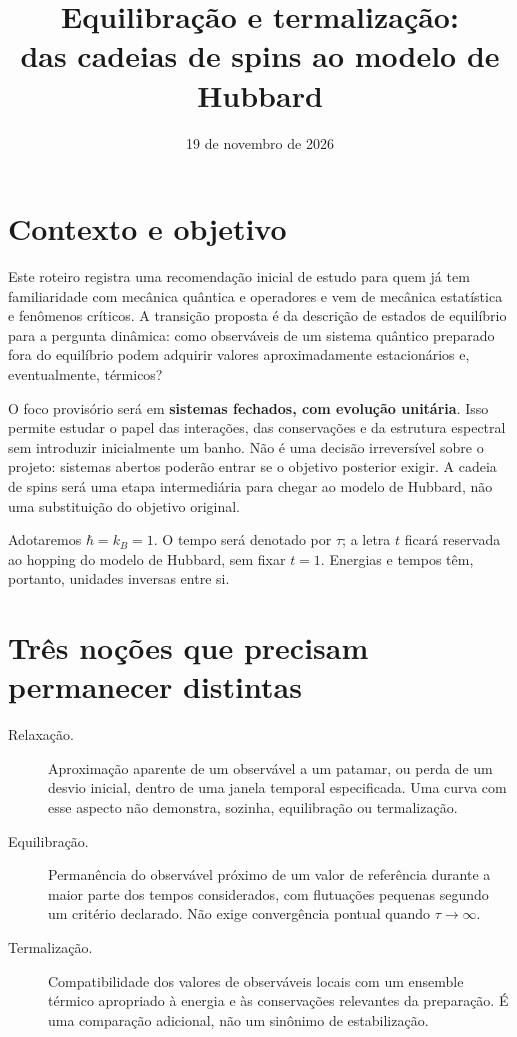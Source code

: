 \documentclass[a4paper,11pt]{article}
\title{Equilibração e termalização:\\das cadeias de spins ao modelo de Hubbard}
\author{}
\date{19 de novembro de 2026}
\begin{document}
\maketitle

\section{Contexto e objetivo}

Este roteiro registra uma recomendação inicial de estudo para quem já tem
familiaridade com mecânica quântica e operadores e vem de mecânica estatística
e fenômenos críticos. A transição proposta é da descrição de estados de
equilíbrio para a pergunta dinâmica: como observáveis de um sistema quântico
preparado fora do equilíbrio podem adquirir valores aproximadamente
estacionários e, eventualmente, térmicos?

O foco provisório será em \textbf{sistemas fechados, com evolução unitária}.
Isso permite estudar o papel das interações, das conservações e da estrutura
espectral sem introduzir inicialmente um banho. Não é uma decisão
irreversível sobre o projeto: sistemas abertos poderão entrar se o objetivo
posterior exigir. A cadeia de spins será uma etapa intermediária para chegar
ao modelo de Hubbard, não uma substituição do objetivo original.

Adotaremos $\hbar=k_B=1$. O tempo será denotado por $\tau$; a letra $t$
ficará reservada ao hopping do modelo de Hubbard, sem fixar $t=1$.
Energias e tempos têm, portanto, unidades inversas entre si.

\section{Três noções que precisam permanecer distintas}

\begin{description}
  \item[Relaxação.] Aproximação aparente de um observável a um patamar,
  ou perda de um desvio inicial, dentro de uma janela temporal especificada.
  Uma curva com esse aspecto não demonstra, sozinha, equilibração ou
  termalização.
  \item[Equilibração.] Permanência do observável próximo de um valor de
  referência durante a maior parte dos tempos considerados, com flutuações
  pequenas segundo um critério declarado. Não exige convergência pontual
  quando $\tau\to\infty$.
  \item[Termalização.] Compatibilidade dos valores de observáveis locais
  com um ensemble térmico apropriado à energia e às conservações relevantes
  da preparação. É uma comparação adicional, não um sinônimo de estabilização.
\end{description}
\end{document}
